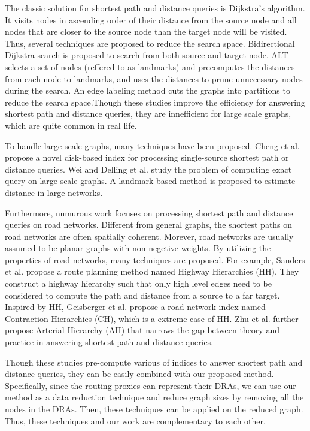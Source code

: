 The classic solution for shortest path and distance queries is Dijkstra's algorithm\cite{Dijkstra59}. It visits nodes in ascending order of their distance from the source node and all nodes that are closer to the source node than the target node will be visited. Thus, several techniques are proposed to reduce the search space\cite{LubyR89, GoldbergH05}. Bidirectional Dijkstra search\cite{LubyR89} is proposed to search from both source and target node. ALT\cite{GoldbergH05} selects a set of nodes (reffered to as landmarks) and precomputes the distances from each node to landmarks, and uses the distances to prune unnecessary nodes during the search. An edge labeling method\cite{MohringSSWW05} cuts the graphs into partitions to reduce the search space.Though these studies improve the efficiency for answering shortest path and distance queries, they are innefficient for large scale graphs, which are quite common in real life.

To handle large scale graphs, many techniques have been proposed\cite{ChengKCC12, delling2014robust, PotamiasBCG09, Wei10}. Cheng et al. \cite{ChengKCC12} propose a novel disk-based index for processing single-source shortest path or distance queries. Wei \cite{Wei10} and Delling et al.\cite{delling2014robust} study the problem of computing exact query on large scale graphs. A landmark-based method\cite{PotamiasBCG09} is proposed to estimate distance in large networks.

Furthermore, numurous work focuses on processing shortest path and distance queries on road networks. Different from general graphs, the shortest paths on road networks are often spatially coherent. Morever, road networks are usually assumed to be planar graphs with non-negetive weights. By utilizing the properties of road networks, many techniques\cite{SandersS05, GeisbergerSSD08, zhu2013shortest} are proposed. For example, Sanders et al. propose a route planning method named Highway Hierarchies (HH)\cite{SandersS05}. They construct a highway hierarchy such that only high level edges need to be considered to compute the path and distance from a source to a far target. Inspired by HH, Geisberger et al.\cite{GeisbergerSSD08} propose a road network index named Contraction Hierarchies (CH), which is a extreme case of HH. Zhu et al. further propose Arterial Hierarchy (AH)\cite{zhu2013shortest} that narrows the gap between theory and practice in answering shortest path and distance queries.

Though these studies pre-compute various of indices to answer shortest path and distance queries, they can be easily combined with our proposed method. Specifically, since the routing proxies can represent their DRAs, we can use our method as a data reduction technique and reduce graph sizes by removing all the nodes in the DRAs. Then, these techniques can be applied on the reduced graph. Thus, these techniques and our work are complementary to each other.

